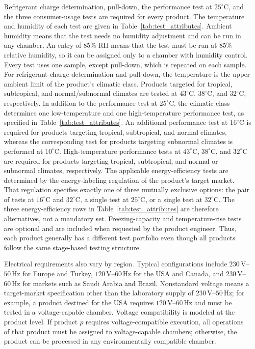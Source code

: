 \documentclass[11pt]{article}
\begin{document}
Refrigerant charge determination, pull-down, the performance test at
\(25^\circ\mathrm{C}\), and the three consumer-usage tests are required
for every product.
The temperature and humidity of each test are given in
Table~\ref{tab:test_attributes}.
Ambient humidity means that the test needs no humidity adjustment and
can be run in any chamber.
An entry of 85\% RH means that the test must be run at 85\% relative
humidity, so it can be assigned only to a chamber with humidity control.
Every test uses one sample, except pull-down, which is repeated on each
sample.
For refrigerant charge determination and pull-down, the temperature is
the upper ambient limit of the product's climatic class.
Products targeted for tropical, subtropical, and normal/subnormal
climates are tested at \(43^\circ\mathrm{C}\), \(38^\circ\mathrm{C}\),
and \(32^\circ\mathrm{C}\), respectively.
In addition to the performance test at \(25^\circ\mathrm{C}\), the
climatic class determines one low-temperature and one high-temperature
performance test, as specified in Table~\ref{tab:test_attributes}.
An additional performance test at \(16^\circ\mathrm{C}\) is required for
products targeting tropical, subtropical, and normal climates, whereas
the corresponding test for products targeting subnormal climates is
performed at \(10^\circ\mathrm{C}\).
High-temperature performance tests at \(43^\circ\mathrm{C}\),
\(38^\circ\mathrm{C}\), and \(32^\circ\mathrm{C}\) are required for
products targeting tropical, subtropical, and normal or subnormal
climates, respectively.
The applicable energy-efficiency tests are determined by the
energy-labeling regulation of the product's target market.
That regulation specifies exactly one of three mutually exclusive
options: the pair of tests at \(16^\circ\mathrm{C}\) and
\(32^\circ\mathrm{C}\), a single test at \(25^\circ\mathrm{C}\), or a
single test at \(32^\circ\mathrm{C}\).
The three energy-efficiency rows in Table~\ref{tab:test_attributes} are
therefore alternatives, not a mandatory set.
Freezing-capacity and temperature-rise tests are optional and are
included when requested by the product engineer.
Thus, each product generally has a different test portfolio even though
all products follow the same stage-based testing structure.

Electrical requirements also vary by region. Typical configurations include \(230\,\mathrm{V}\)--\(50\,\mathrm{Hz}\) for Europe and Turkey, \(120\,\mathrm{V}\)--\(60\,\mathrm{Hz}\) for the USA and Canada, and \(230\,\mathrm{V}\)--\(60\,\mathrm{Hz}\) for markets such as Saudi Arabia and Brazil. Nonstandard voltage means a target-market specification other than the laboratory supply of \(230\,\mathrm{V}\)--\(50\,\mathrm{Hz}\); for example, a product destined for the USA requires \(120\,\mathrm{V}\)--\(60\,\mathrm{Hz}\) and must be tested in a voltage-capable chamber. Voltage compatibility is modeled at the product level. If product \(p\) requires voltage-compatible execution, all operations of that product must be assigned to voltage-capable chambers; otherwise, the product can be processed in any environmentally compatible chamber.
\end{document}
